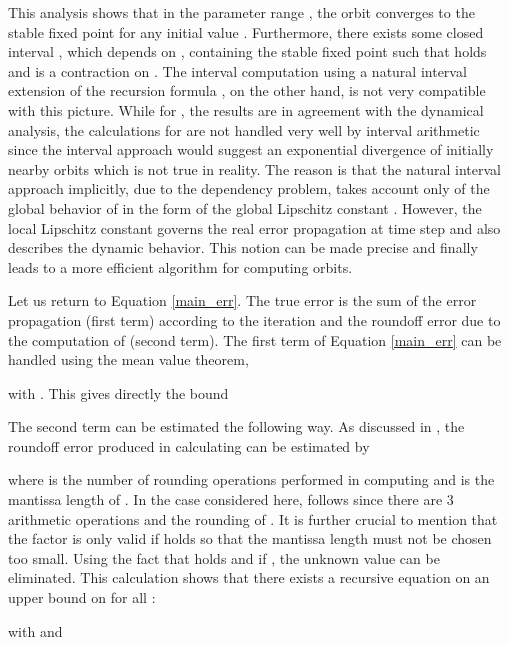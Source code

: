 \documentclass[copyright,creativecommons]{eptcs}
\theoremstyle{definition}
\begin{document}
This analysis shows that in the parameter range ,
the orbit converges to the stable fixed point for any initial value
. Furthermore, there exists some closed interval ,
which depends on , containing the stable fixed point such that
 holds and  is a contraction on . The interval
computation using a natural interval extension of the recursion 
formula , on the other hand, is not very compatible with
this picture. While for , the results are
in agreement with the dynamical analysis, the calculations for
 are not handled very well by interval arithmetic since
the interval approach would suggest an exponential divergence of
initially nearby orbits which is not true in reality. The reason is
that the natural interval approach implicitly, due to the dependency problem,
takes account only of the global behavior of  in the form of the global
Lipschitz constant . However, the local
Lipschitz constant  governs the
real error propagation at time step  and also describes the dynamic behavior.
This notion can be made precise and finally leads to a more efficient
algorithm for computing orbits.

Let us return to Equation \ref{main_err}. The true error is the sum of
the error propagation (first term) according to the iteration and the
roundoff error due to the computation of  (second term). The
first term of Equation \ref{main_err} can be handled using the mean
value theorem,

with . This gives directly the
bound

The second term can be estimated the following way. As discussed in
\cite{wi63}, the roundoff error produced in calculating  can be
estimated by

where  is the number of rounding operations performed in computing
 and  is the mantissa length of . In
the case considered here,  follows since there are 3 arithmetic
operations and the rounding of . It is further crucial to
mention that the factor  is only valid if 
holds so that the mantissa length must not be chosen too small.
Using the fact that  holds and 
if , the unknown value  can be eliminated.
This calculation shows that there exists a recursive equation
on an upper bound  on  for all :

with  and
 
\end{document}
